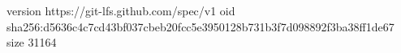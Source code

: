 version https://git-lfs.github.com/spec/v1
oid sha256:d5636c4c7cd43bf037cbeb20fcc5e3950128b731b3f7d098892f3ba38ff1de67
size 31164
